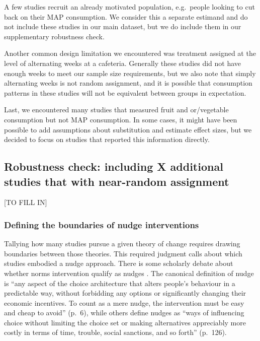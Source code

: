 \documentclass[sn-nature,pdflatex]{sn-jnl}
\begin{document}
A few studies recruit an already motivated population, e.g.~people
looking to cut back on their MAP consumption. We consider this a
separate estimand and do not include these studies in our main dataset,
but we do include them in our supplementary robustness check.

Another common design limitation we encountered was treatment assigned
at the level of alternating weeks at a cafeteria. Generally these
studies did not have enough weeks to meet our sample size requirements,
but we also note that simply alternating weeks is not random assignment,
and it is possible that consumption patterns in these studies will not
be equivalent between groups in expectation.

Last, we encountered many studies that measured fruit and or/vegetable
consumption but not MAP consumption. In some cases, it might have been
possible to add assumptions about substitution and estimate effect
sizes, but we decided to focus on studies that reported this information
directly.

\subsection{Robustness check: including X additional studies that with
near-random
assignment}\label{robustness-check-including-x-additional-studies-that-with-near-random-assignment}

{[}TO FILL IN{]}

\subsubsection{Defining the boundaries of nudge
interventions}\label{defining-the-boundaries-of-nudge-interventions}

Tallying how many studies pursue a given theory of change requires
drawing boundaries between those theories. This required judgment calls
about which studies embodied a nudge approach. There is some scholarly
debate about whether norms intervention qualify as nudges
\citep{bicchieri2023}. The canonical definition of nudge
\citep{thaler2009} is ``any aspect of the choice architecture that
alters people's behaviour in a predictable way, without forbidding any
options or significantly changing their economic incentives. To count as
a mere nudge, the intervention must be easy and cheap to avoid'' (p.~6),
while others \citep{hausman2010} define nudges as ``ways of influencing
choice without limiting the choice set or making alternatives
appreciably more costly in terms of time, trouble, social sanctions, and
so forth'' (p.~126).
\end{document}

